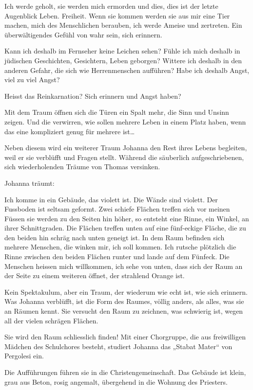 \documentclass[10pt,titlepage,a5paper]{book}
\begin{document}
Ich werde geholt, sie werden mich ermorden und dies, dies ist der letzte Augenblick Leben. Freiheit. Wenn sie kommen werden sie aus mir eine Tier machen, mich des Menschlichen berauben, ich werde Ameise und zertreten.
Ein überwältigendes Gefühl von wahr sein, sich erinnern.

Kann ich deshalb im Fernseher keine Leichen sehen? Fühle ich mich deshalb in jüdischen Geschichten, Gesichtern, Leben geborgen?  Wittere ich deshalb in den anderen Gefahr, die sich wie Herrenmenschen aufführen? Habe ich deshalb Angst, viel zu viel Angst? 

Heisst das Reinkarnation? Sich erinnern und Angst haben?

Mit dem Traum öffnen sich die Türen ein Spalt mehr, die Sinn und Unsinn zeigen. Und die verwirren, wie sollen mehrere Leben in einem Platz haben, wenn das eine kompliziert genug für mehrere ist\dots 

Neben diesem wird ein weiterer Traum Johanna den Rest ihres Lebens begleiten, weil er sie verblüfft und Fragen stellt. Während die säuberlich aufgeschriebenen, sich wiederholenden Träume von Thomas versinken.

Johanna träumt:

Ich komme in ein Gebäude, das violett ist. Die Wände sind violett. Der Fussboden ist seltsam geformt. Zwei schiefe Flächen treffen sich vor meinen Füssen sie werden zu den Seiten hin höher, so entsteht eine Rinne, ein Winkel, an ihrer Schnittgraden. Die Flächen treffen unten auf eine fünf-eckige Fläche, die zu den beiden hin schräg nach unten geneigt ist. In dem Raum befinden sich mehrere Menschen,  die winken mir, ich soll kommen. Ich rutsche plötzlich die Rinne zwischen den beiden Flächen runter und lande auf dem Fünfeck. Die Menschen heissen mich willkommen, ich sehe von unten, dass sich der Raum an der Seite zu einem weiteren öffnet, der strahlend Orange ist.

 Kein Spektakulum, aber ein Traum, der wiederum wie echt ist, wie sich erinnern. Was Johanna verblüfft, ist die Form des Raumes, völlig anders, als alles, was sie an Räumen kennt. Sie versucht den Raum zu zeichnen, was schwierig ist, wegen all der vielen schrägen Flächen.
 
Sie wird den Raum schliesslich finden! Mit einer Chorgruppe, die aus freiwilligen Mädchen des Schulchores besteht, studiert Johanna das „Stabat Mater“ von Pergolesi ein. 

Die Aufführungen führen sie in die Christengemeinschaft. Das Ge\-bäude ist klein, grau aus Beton, rosig angemalt, übergehend in die Wohnung des Priesters.
\end{document}
